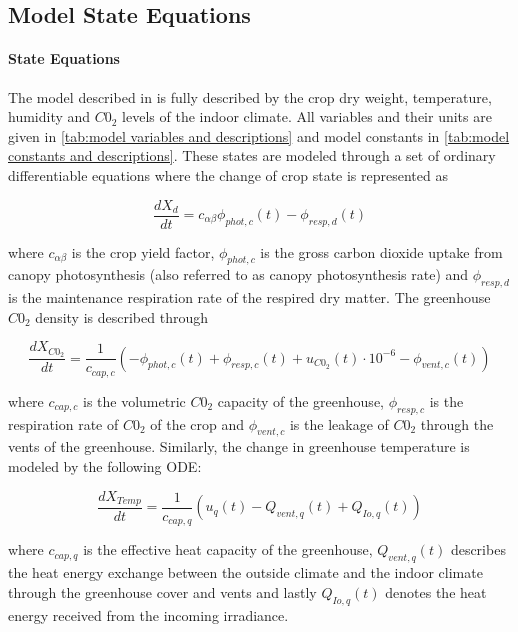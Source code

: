 \subsection {Model State Equations}

\paragraph{State Equations}
The model described in \cite{hentenGreenhouseClimateManagement1994} is fully described by the crop dry weight, temperature, humidity and $C0_2$ levels of the indoor climate. All variables and their units are given in \autoref{tab:model variables and descriptions} and model constants in \autoref{tab:model constants and descriptions}. These states are modeled through a set of ordinary differentiable equations where the change of crop state is represented as

\begin{equation}
	\frac{dX_d}{dt} = c_{\alpha \beta} \phi_{phot,c}(t) - \phi_{resp,d}(t)
\end{equation}

where $c_{\alpha \beta}$ is the crop yield factor, $\phi_{phot,c}$ is the gross carbon dioxide uptake from canopy photosynthesis (also referred to as canopy photosynthesis rate) and $\phi_{resp,d}$ is the maintenance respiration rate of the respired dry matter. 
The greenhouse $C0_2$ density is described through

\begin{equation}
	\frac{dX_{C0_2}}{dt} = \frac{1}{c_{cap,c}}(-\phi_{phot,c}(t) + \phi_{resp,c}(t) + u_{C0_2}(t) \cdot 10^{-6} - \phi_{vent,c}(t))
\end{equation}

where $c_{cap,c}$ is the volumetric $C0_2$ capacity of the greenhouse, $\phi_{resp,c}$ is the respiration rate of $C0_2$ of the crop and $\phi_{vent,c}$ is the  leakage of $C0_2$ through the vents of the greenhouse. Similarly, the change in greenhouse temperature is modeled by the following ODE:

\begin{equation}
	\frac{dX_{Temp}}{dt} = \frac{1}{c_{cap,q}}(u_{q}(t) - Q_{vent,q}(t) + Q_{Io,q}(t))
\end{equation}

where $c_{cap,q}$ is the effective heat capacity of the greenhouse, $Q_{vent,q}(t)$ describes the heat energy exchange between the outside climate and the indoor climate through the greenhouse cover and vents and lastly $Q_{Io,q}(t)$ denotes the heat energy received from the incoming irradiance.

